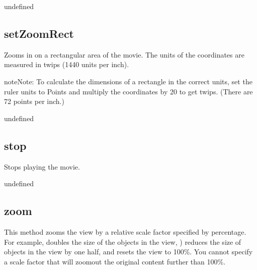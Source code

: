 \documentclass[letterpaper,12pt,english,openany,oneside]{sphinxmanual}
\begin{document}
\label{\detokenize{JS_3D_API:section-29}}\label{\detokenize{JS_3D_API:returns-28}}

undefined


\subsection{setZoomRect}
\label{\detokenize{JS_3D_API:setzoomrect}}
Zooms in on a rectangular area of the movie. The units of the coordinates are measured in twips (1440 units per inch).

\begin{sphinxadmonition}{note}{Note:}
To calculate the dimensions of a rectangle in the correct units, set the ruler units to Points and multiply the coordinates by 20 to get twips. (There are 72 points per inch.)
\end{sphinxadmonition}
\label{\detokenize{JS_3D_API:syntax-29}}

\begin{sphinxVerbatim}[commandchars=\\\{\}]
   
\end{sphinxVerbatim}
\label{\detokenize{JS_3D_API:parameters-19}}

\label{\detokenize{JS_3D_API:section-30}}\label{\detokenize{JS_3D_API:returns-29}}

undefined


\subsection{stop}
\label{\detokenize{JS_3D_API:stop}}
Stops playing the movie.

\label{\detokenize{JS_3D_API:syntax-30}}

\begin{sphinxVerbatim}[commandchars=\\\{\}]
\end{sphinxVerbatim}
\label{\detokenize{JS_3D_API:returns-30}}

undefined


\subsection{zoom}
\label{\detokenize{JS_3D_API:zoom}}
This method zooms the view by a relative scale factor specified by percentage. For example,  doubles the size of the objects in the view,  ) reduces the size of objects in the view by one half, and  resets the view to 100\%. You cannot specify a scale factor that will zoom\sphinxhyphen{}out the original content further than 100\%.
\end{document}
